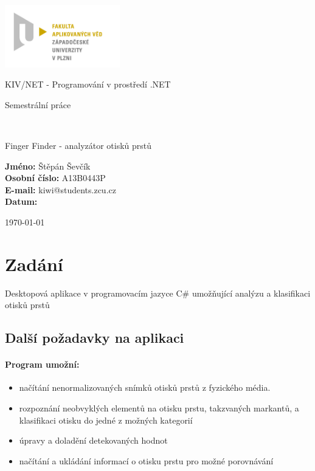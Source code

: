 \documentclass[12pt,a4paper]{article}
\author{Jan Šmejkal}
\let\oldsection\section
\renewcommand\section{\clearpage\oldsection}
\begin{document}
\begin{titlepage}

\includegraphics[width=50mm]{img/FAV.jpg}
\\[160 pt]
\centerline{ \Huge \sc KIV/NET - Programování v prostředí .NET}
\centerline{ \huge \sc Semestrální práce }
\\[12 pt]
{\large \sc
\centerline{Finger Finder - analyzátor otisků prstů}
}


{
\vfill 
\parindent=0cm
\textbf{Jméno:} Štěpán Ševčík\\
\textbf{Osobní číslo:} A13B0443P\\
\textbf{E-mail:} kiwi@students.zcu.cz\\
\textbf{Datum:} {\large \today\par} %

}

\end{titlepage}


\newpage
\setcounter{page}{2}
\setcounter{tocdepth}{3}
\tableofcontents

\section{Zadání}
Desktopová aplikace v programovacím jazyce C\# umožňující analýzu a klasifikaci otisků prstů
\subsection{Další požadavky na aplikaci}

\paragraph{Program umožní:}
\begin{itemize}
\item načítání nenormalizovaných snímků otisků prstů z fyzického média.
\item rozpoznání neobvyklých elementů na otisku prstu, takzvaných markantů, a klasifikaci otisku do jedné z možných kategorií
\item úpravy a doladění detekovaných hodnot
\item načítání a ukládání informací o otisku prstu pro možné porovnávání
\end{itemize}
\end{document}
